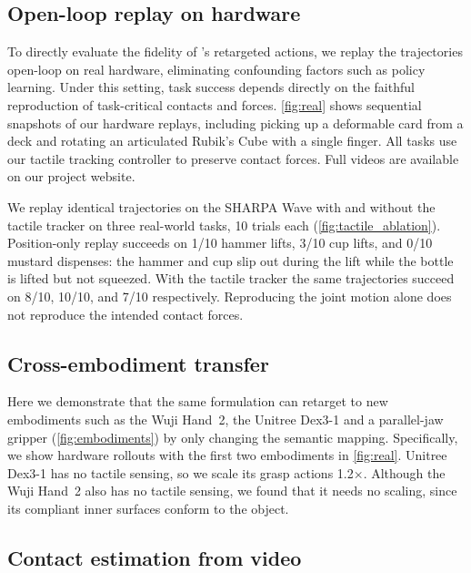 \subsection{Open-loop replay on hardware}
\label{sec:exp:real}

To directly evaluate the fidelity of \ours's retargeted actions, we replay the trajectories open-loop on real hardware, eliminating confounding factors such as policy learning. Under this setting, task success depends directly on the faithful reproduction of task-critical contacts and forces. \cref{fig:real} shows sequential snapshots of our hardware replays, including picking up a deformable card from a deck and rotating an articulated Rubik’s Cube with a single finger. All tasks use our tactile tracking controller to preserve contact forces. Full videos are available on our project website.

 We replay identical \ours trajectories on the SHARPA Wave with and without the tactile tracker on three real-world tasks, 10 trials each (\cref{fig:tactile_ablation}). Position-only replay succeeds on 1/10 hammer lifts, 3/10 cup lifts, and 0/10 mustard dispenses: the hammer and cup slip out during the lift while the bottle is lifted but not squeezed. With the tactile tracker the same trajectories succeed on 8/10, 10/10, and 7/10 respectively. Reproducing the joint motion alone does not reproduce the intended contact forces.


\subsection{Cross-embodiment transfer}
\label{sec:exp:embodiment}

Here we demonstrate that the same \fca formulation can retarget to new embodiments such as the Wuji Hand~2, the Unitree Dex3-1 and a parallel-jaw gripper (\cref{fig:embodiments}) by only changing the semantic mapping. Specifically, we show hardware rollouts with the first two embodiments in \cref{fig:real}. Unitree Dex3-1 has no tactile sensing, so we scale its grasp actions 1.2$\times$. Although the Wuji Hand~2 also has no tactile sensing, we found that it needs no scaling, since its compliant inner surfaces conform to the object.



\subsection{Contact estimation from video}
\label{sec:exp:vidhaco}

